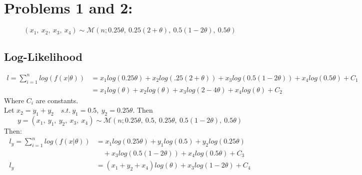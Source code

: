 \documentclass[12pt]{article}
\begin{document}
	
	\section*{Problems 1 and 2:}
		\[ ( x_1,\ x_2,\ x_3,\ x_4 ) \sim \mathcal{M}(n; 0.25 \theta,\ 0.25 (2+\theta),\ 0.5(1-2\theta),\ 0.5\theta ) \]
	
	\subsection*{Log-Likelihood}
		\begin{align*}
			l=\sum_{i=1}^{n} log(f(x|\theta)) &= x_1 log (0.25\theta)+x_2log(.25(2+\theta)) + x_3log(0.5(1-2\theta)) + x_4log(0.5\theta) + C_1 \\
			&= x_1 log (\theta)+x_2log(\theta) + x_3log(2-4\theta) + x_4log(\theta) + C_2
		\end{align*}  
	Where $ C_i $ are constants.\\
	Let $ x_2=y_1+y_2 \quad s.t.\ y_1=0.5,\ y_2=0.25\theta $. Then 
	\[ y=(x_1,\ y_1,\ y_2,\ x_3,\ x_4) \sim \mathcal{M}(n; 0.25 \theta,\ 0.5,\ 0.25\theta ,\ 0.5(1-2\theta),\ 0.5\theta )  \]
	Then: 
	 \begin{align*}
	 	l_y = \sum_{i=1}^{n} log(f(x|\theta)) &= x_1 log (0.25\theta)+y_1log(0.5)+y_2log(0.25\theta)\\
	 	& \quad + x_3log(0.5(1-2\theta)) + x_4log(0.5\theta) + C_3 \\
	 l_y	&= (x_1 +y_2+x_4)log(\theta) + x_3log(1-2\theta) + C_4
	 \end{align*}
	
\end{document}
